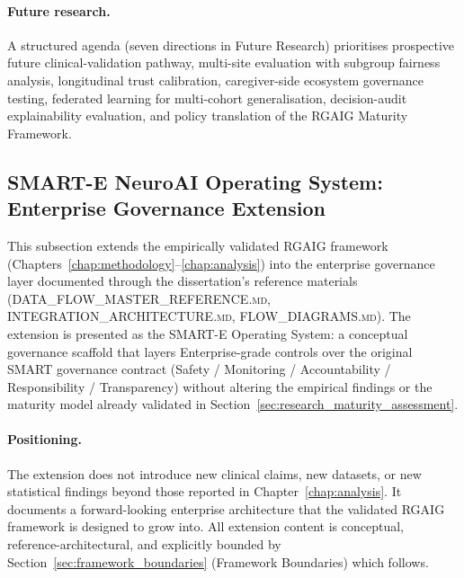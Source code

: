 \paragraph{Future research.} A structured agenda (seven directions in Future Research) prioritises prospective future clinical-validation pathway, multi-site evaluation with subgroup fairness analysis, longitudinal trust calibration, caregiver-side ecosystem governance testing, federated learning for multi-cohort generalisation, decision-audit explainability evaluation, and policy translation of the RGAIG Maturity Framework.

\subsection{SMART-E NeuroAI Operating System: Enterprise Governance Extension}
\label{sec:smart_e_extension}

This subsection extends the empirically validated RGAIG framework (Chapters~\ref{chap:methodology}--\ref{chap:analysis}) into the enterprise governance layer documented through the dissertation's reference materials (\textsc{DATA\_FLOW\_MASTER\_REFERENCE.md}, \textsc{INTEGRATION\_ARCHITECTURE.md}, \textsc{FLOW\_DIAGRAMS.md}). The extension is presented as the SMART-E Operating System: a conceptual governance scaffold that layers Enterprise-grade controls over the original SMART governance contract (Safety / Monitoring / Accountability / Responsibility / Transparency) without altering the empirical findings or the maturity model already validated in Section~\ref{sec:research_maturity_assessment}.

\paragraph{Positioning.} The extension does not introduce new clinical claims, new datasets, or new statistical findings beyond those reported in Chapter~\ref{chap:analysis}. It documents a forward-looking enterprise architecture that the validated RGAIG framework is designed to grow into. All extension content is conceptual, reference-architectural, and explicitly bounded by Section~\ref{sec:framework_boundaries} (Framework Boundaries) which follows.

